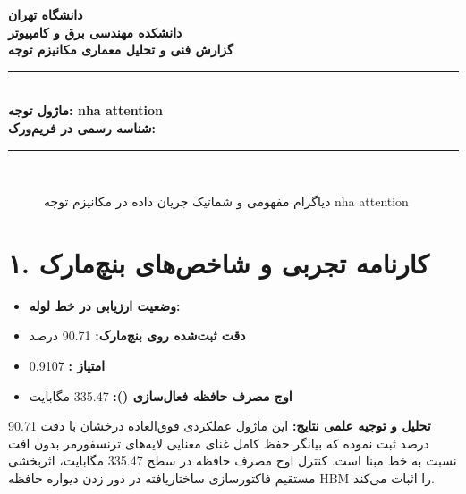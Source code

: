 \documentclass[12pt,a4paper]{article}
\begin{document}
\begin{center}
{\Large\bfseries دانشگاه تهران}\\[0.2cm]
{\large\bfseries دانشکده مهندسی برق و کامپیوتر}\\[0.2cm]
{\large\bfseries گزارش فنی و تحلیل معماری مکانیزم توجه}\\[0.5cm]
\rule{\linewidth}{1pt}\\[0.3cm]
{\LARGE\bfseries ماژول توجه: nha attention}\\[0.2cm]
{\large \textbf{شناسه رسمی در فریم‌ورک:} }\\[0.2cm]
\rule{\linewidth}{1pt}\\[0.5cm]
\end{center}

\begin{figure}[H]
\centering
{}
\caption{دیاگرام مفهومی و شماتیک جریان داده در مکانیزم توجه nha attention}
\end{figure}

\section*{۱. کارنامه تجربی و شاخص‌های بنچ‌مارک}
\begin{itemize}
\item \textbf{وضعیت ارزیابی در خط لوله:} 
\item \textbf{دقت ثبت‌شده روی بنچ‌مارک:} 90.71 درصد
\item \textbf{امتیاز :} 0.9107
\item \textbf{اوج مصرف حافظه فعال‌سازی ():} 335.47 مگابایت
\end{itemize}
\textbf{تحلیل و توجیه علمی نتایج:} این ماژول عملکردی فوق‌العاده درخشان با دقت 90.71 درصد ثبت نموده که بیانگر حفظ کامل غنای معنایی لایه‌های ترنسفورمر بدون افت نسبت به خط مبنا است. کنترل اوج مصرف حافظه در سطح 335.47 مگابایت، اثربخشی مستقیم فاکتورسازی ساختاریافته در دور زدن دیواره حافظه HBM را اثبات می‌کند.
\end{document}
